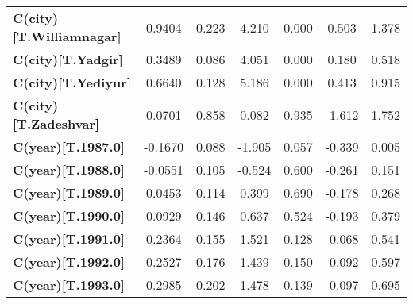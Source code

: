 \begin{center}
\begin{tabular}{lcccccc}
\textbf{C(city)[T.Williamnagar]}                                                                    &       0.9404  &        0.223     &     4.210  &         0.000        &        0.503    &        1.378     \\
\textbf{C(city)[T.Yadgir]}                                                                          &       0.3489  &        0.086     &     4.051  &         0.000        &        0.180    &        0.518     \\
\textbf{C(city)[T.Yediyur]}                                                                         &       0.6640  &        0.128     &     5.186  &         0.000        &        0.413    &        0.915     \\
\textbf{C(city)[T.Zadeshvar]}                                                                       &       0.0701  &        0.858     &     0.082  &         0.935        &       -1.612    &        1.752     \\
\textbf{C(year)[T.1987.0]}                                                                          &      -0.1670  &        0.088     &    -1.905  &         0.057        &       -0.339    &        0.005     \\
\textbf{C(year)[T.1988.0]}                                                                          &      -0.0551  &        0.105     &    -0.524  &         0.600        &       -0.261    &        0.151     \\
\textbf{C(year)[T.1989.0]}                                                                          &       0.0453  &        0.114     &     0.399  &         0.690        &       -0.178    &        0.268     \\
\textbf{C(year)[T.1990.0]}                                                                          &       0.0929  &        0.146     &     0.637  &         0.524        &       -0.193    &        0.379     \\
\textbf{C(year)[T.1991.0]}                                                                          &       0.2364  &        0.155     &     1.521  &         0.128        &       -0.068    &        0.541     \\
\textbf{C(year)[T.1992.0]}                                                                          &       0.2527  &        0.176     &     1.439  &         0.150        &       -0.092    &        0.597     \\
\textbf{C(year)[T.1993.0]}                                                                          &       0.2985  &        0.202     &     1.478  &         0.139        &       -0.097    &        0.695     \\

\end{tabular}
\end{center}
